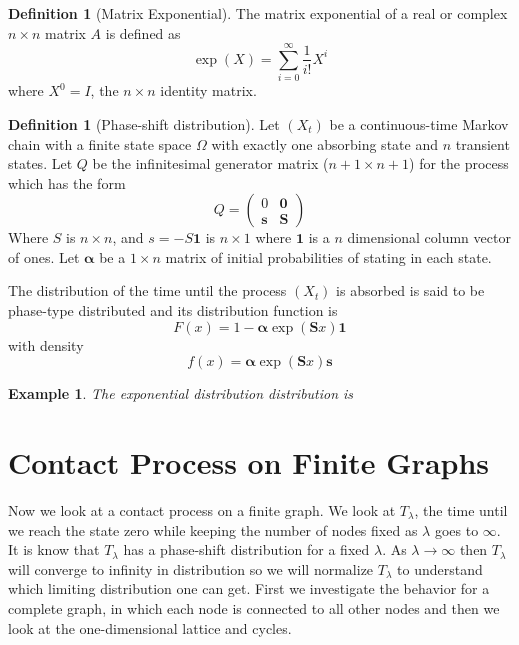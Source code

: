 \documentclass{article}
\theoremstyle{plain}
\newtheorem{example}{Example}[theorem]
\theoremstyle{definition}
\newtheorem{defn}[theorem]{Definition}
\theoremstyle{remark}
\numberwithin{equation}{section}
\begin{document}
\begin{defn}[Matrix Exponential]
The matrix exponential of a real or complex $n \times n$ matrix $A$ is defined as
$$
\exp(X) = \sum_{i = 0}^\infty \frac{1}{i!} X^i
$$
where $X^0 = I$, the $n \times n$ identity matrix.
\end{defn}

\begin{defn}[Phase-shift distribution] \cite{mle_phase_type2011}
Let $(X_t)$ be a continuous-time Markov chain with a finite state space $\Omega$ with exactly one absorbing state and $n$ transient states.
Let $Q$ be the infinitesimal generator matrix ($n + 1 \times n + 1$) for the process which has the form
$$
Q = \begin{pmatrix}
0 & \mathbf{0}\\
\mathbf{s} & \mathbf{S}
\end{pmatrix}
$$
Where $S$ is $n \times n$, and $s = - S \mathbf{1}$ is $n \times 1$ where $\mathbf{1}$ is a $n$ dimensional column vector of ones.
Let $\boldsymbol{\alpha}$ be a $1 \times n$ matrix of initial probabilities of stating in each state.

The distribution of the time until the process $(X_t)$ is absorbed is said to be phase-type distributed and its distribution function is 
$$
F(x) = 1 - \boldsymbol{\alpha} \exp(\mathbf{S} x) \mathbf{1}
$$
with density
$$
f(x) = \boldsymbol{\alpha} \exp(\mathbf{S} x) \mathbf{s}
$$
\end{defn}

\begin{example}
The exponential distribution distribution is 
\end{example}

\section{Contact Process on Finite Graphs}

Now we look at a contact process on a finite graph.
We look at $T_\lambda$, the time until we reach the state zero while keeping the number of nodes fixed as $\lambda$ goes to $\infty$.
It is know that $T_\lambda$ has a phase-shift distribution for a fixed $\lambda$.
As $\lambda \to \infty$ then $T_\lambda$ will converge to infinity in distribution so we will normalize $T_\lambda$ to understand which limiting distribution one can get.
First we investigate the behavior for a complete graph, in which each node is connected to all other nodes and then we look at the one-dimensional lattice and cycles.
\end{document}
